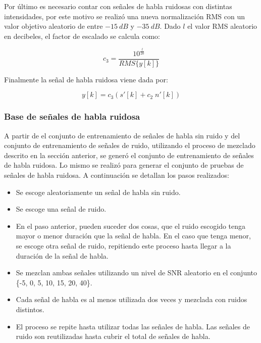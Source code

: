 Por último es necesario contar con señales de habla ruidosas con distintas intensidades, por este motivo se realizó una nueva normalización RMS con un valor objetivo aleatorio de entre $\SI{-15}{dB}$ y $\SI{-35}{dB}$. Dado $l$ el valor RMS aleatorio en decibeles, el factor de escalado se calcula como:

\begin{equation*}
	c_3 = \frac{10^{\frac{l}{20}}}{RMS\{y[k]\}}
\end{equation*}

Finalmente la señal de habla ruidosa viene dada por:

\begin{equation*}
	y[k] = c_3 \left( s'[k] + c_2 \; n'[k] \right)
\end{equation*}

\subsubsection{Base de señales de habla ruidosa}

A partir de el conjunto de entrenamiento de señales de habla sin ruido y del conjunto de entrenamiento de señales de ruido, utilizando el proceso de mezclado descrito en la sección anterior, se generó el conjunto de entrenamiento de señales de habla ruidosa. Lo mismo se realizó para generar el conjunto de pruebas de señales de habla ruidosa. A continuación se detallan los pasos realizados:

\begin{itemize}
	\item Se escoge aleatoriamente un señal de habla sin ruido.
	\item Se escoge una señal de ruido.
	\item En el paso anterior, pueden suceder dos cosas, que el ruido escogido tenga mayor o menor duración que la señal de habla. En el caso que tenga menor, se escoge otra señal de ruido, repitiendo este proceso hasta llegar a la duración de la señal de habla.
	\item Se mezclan ambas señales utilizando un nivel de SNR aleatorio en el conjunto \{-5, 0, 5, 10, 15, 20, 40\}.
	\item Cada señal de habla es al menos utilizada dos veces y mezclada con ruidos distintos.
	\item El proceso se repite hasta utilizar todas las señales de habla. Las señales de ruido son reutilizadas hasta cubrir el total de señales de habla.
\end{itemize}

